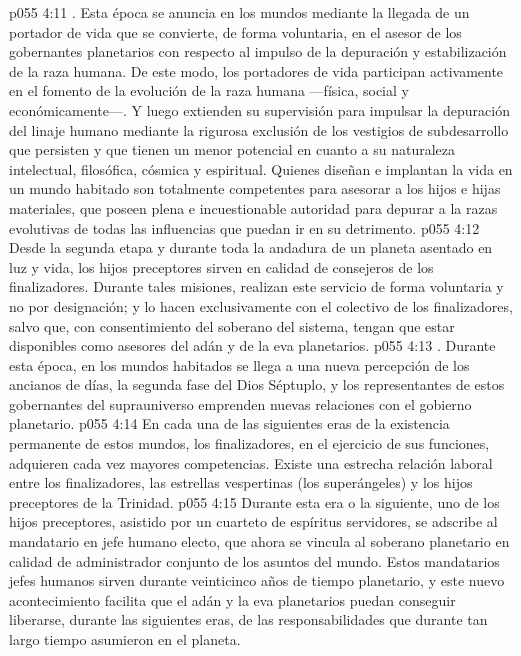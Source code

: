 \vs p055 4:11 . Esta época se anuncia en los mundos mediante la llegada de un portador de vida que se convierte, de forma voluntaria, en el asesor de los gobernantes planetarios con respecto al impulso de la depuración y estabilización de la raza humana. De este modo, los portadores de vida participan activamente en el fomento de la evolución de la raza humana ---física, social y económicamente---. Y luego extienden su supervisión para impulsar la depuración del linaje humano mediante la rigurosa exclusión de los vestigios de subdesarrollo que persisten y que tienen un menor potencial en cuanto a su naturaleza intelectual, filosófica, cósmica y espiritual. Quienes diseñan e implantan la vida en un mundo habitado son totalmente competentes para asesorar a los hijos e hijas materiales, que poseen plena e incuestionable autoridad para depurar a la razas evolutivas de todas las influencias que puedan ir en su detrimento.
\vs p055 4:12 Desde la segunda etapa y durante toda la andadura de un planeta asentado en luz y vida, los hijos preceptores sirven en calidad de consejeros de los finalizadores. Durante tales misiones, realizan este servicio de forma voluntaria y no por designación; y lo hacen exclusivamente con el colectivo de los finalizadores, salvo que, con consentimiento del soberano del sistema, tengan que estar disponibles como asesores del adán y de la eva planetarios.
\vs p055 4:13 . Durante esta época, en los mundos habitados se llega a una nueva percepción de los ancianos de días, la segunda fase del Dios Séptuplo, y los representantes de estos gobernantes del suprauniverso emprenden nuevas relaciones con el gobierno planetario.
\vs p055 4:14 En cada una de las siguientes eras de la existencia permanente de estos mundos, los finalizadores, en el ejercicio de sus funciones, adquieren cada vez mayores competencias. Existe una estrecha relación laboral entre los finalizadores, las estrellas vespertinas (los superángeles) y los hijos preceptores de la Trinidad.
\vs p055 4:15 Durante esta era o la siguiente, uno de los hijos preceptores, asistido por un cuarteto de espíritus servidores, se adscribe al mandatario en jefe humano electo, que ahora se vincula al soberano planetario en calidad de administrador conjunto de los asuntos del mundo. Estos mandatarios jefes humanos sirven durante veinticinco años de tiempo planetario, y este nuevo acontecimiento facilita que el adán y la eva planetarios puedan conseguir liberarse, durante las siguientes eras, de las responsabilidades que durante tan largo tiempo asumieron en el planeta.
